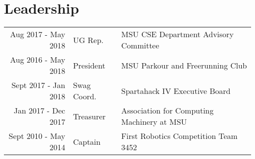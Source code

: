 \documentclass[]{deedy-resume-openfont}
\begin{document}
\begin{minipage}[t]{0.66\textwidth}
\section{Leadership} 

\begin{tabular}{rll}
Aug 2017 - May 2018 & UG Rep. & MSU CSE Department Advisory Committee\\
Aug 2016 - May 2018 & President & MSU Parkour and Freerunning Club\\
Sept 2017 - Jan 2018 & Swag Coord. & Spartahack IV Executive Board\\
Jan 2017 - Dec 2017 & Treasurer & Association for Computing Machinery at MSU\\
Sept 2010 - May 2014 & Captain & First Robotics Competition Team 3452\\
\end{tabular}
\sectionsep

\end{minipage} 
\end{document}
